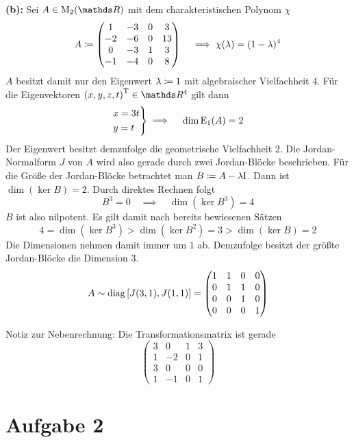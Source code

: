 		\textbf{(b):}
		Sei $A\in\m{M}_2(\SR)$ mit dem charakteristischen Polynom $\chi$
		\[
			A \coloneqq
			\begin{pmatrix}
				1 & -3 & 0 & 3 \\
				-2 & -6 & 0 & 13 \\
				0 & -3 & 1 & 3 \\
				-1 & -4 & 0 & 8
			\end{pmatrix}
			\quad \implies \chi(\lambda) = (1-\lambda)^4
		\]
		$A$ besitzt damit nur den Eigenwert $\lambda\coloneqq 1$ mit algebraischer Vielfachheit $4$.
		Für die Eigenvektoren $\transp{(x,y,z,t)}\in\SR^4$ gilt dann
		\begin{alignat*}{3}
			\begin{drcases}
				x = 3t \\
				y = t
			\end{drcases}
			\implies \quad \dim \m{E}_{1}(A) = 2
		\end{alignat*}
		Der Eigenwert besitzt demzufolge die geometrische Vielfachheit $2$.
		Die Jordan-Normalform $J$ von $A$ wird also gerade durch zwei Jordan-Blöcke beschrieben.
		Für die Größe der Jordan-Blöcke betrachtet man $B\coloneqq A-\lambda\mathrm{I}$.
		Dann ist $\dim(\ker B) = 2$.
		Durch direktes Rechnen folgt
		\[ B^3 = 0 \quad \implies \quad \dim(\ker B^3) = 4 \]
		$B$ ist also nilpotent.
		Es gilt damit nach bereits bewiesenen Sätzen
		\[ 4 =\dim(\ker B^3) > \dim(\ker B^2) = 3 > \dim(\ker B) =2 \]
		Die Dimensionen nehmen damit immer um $1$ ab.
		Demzufolge besitzt der größte Jordan-Blöcke die Dimension $3$.
		\[
			A\sim \operatorname{diag}\left[  J(3,1), J(1,1)  \right] =
			\begin{pmatrix}
				1 & 1 & 0 & 0 \\
				0 & 1 & 1 & 0 \\
				0 & 0 & 1 & 0 \\
				0 & 0 & 0 & 1
			\end{pmatrix}
		\]

		Notiz zur Nebenrechnung:
		Die Transformationsmatrix ist gerade
		\[
			\begin{pmatrix}
				3 & 0 & 1 & 3 \\
				1 & -2 & 0 & 1 \\
				3 & 0 & 0 & 0 \\
				1 & -1 & 0 & 1
			\end{pmatrix}
		\]


	\section*{Aufgabe 2} %
	\label{sec:aufgabe_2}
	
